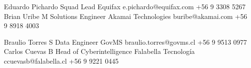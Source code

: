 %
%
%


\begin{referees}
	{Eduardo Pichardo}
	{Squad Lead}
	{Equifax}
	{e.pichardo@equifax.com}
	{+56 9 3308 5267}
	{Brian Uribe M}
	{Solutions Engineer}
	{Akamai Technologies}
	{buribe@akamai.com}
	{+56 9 8918 4003}
\end{referees}

\begin{referees}
	{Braulio Torres S}
	{Data Engineer}
	{GovMS}
	{braulio.torres@govms.cl}
	{+56 9 9513 0977}
	{Carlos Cuevas B}
	{Head of Cyberintelligence}
	{Falabella Tecnología}
	{ccuevasb@falabella.cl}
	{+56 9 9221 0445}
\end{referees}

